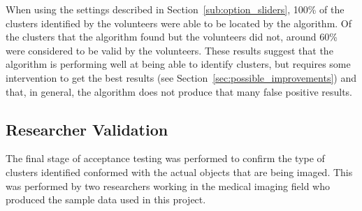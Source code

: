 When using the settings described in Section~\ref{sub:option_sliders}, 100\% of
the clusters identified by the volunteers were able to be located by the
algorithm. Of the clusters that the algorithm found but the volunteers did not,
around 60\% were considered to be valid by the volunteers. These results
suggest that the algorithm is performing well at being able to identify
clusters, but requires some intervention to get the best results (see
Section~\ref{sec:possible_improvements}) and that, in general, the algorithm
does not produce that many false positive results.

\subsection{Researcher Validation}
\label{sub:researcher_validation}

The final stage of acceptance testing was performed to confirm the type of
clusters identified conformed with the actual objects that are being imaged.
This was performed by two researchers working in the medical imaging field who
produced the sample data used in this project.
